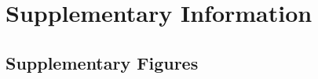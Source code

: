 \documentclass[11pt]{article}
\newcommand{\beginsupplement}{%
	\setcounter{table}{0}
	\setcounter{figure}{0}
	\renewcommand{\thetable}{S\arabic{table}}%
	\renewcommand{\thefigure}{S\arabic{figure}}%
}
\begin{document}

  













\newpage

\beginsupplement
\section{Supplementary Information}

\subsection{Supplementary Figures}
\end{document}
